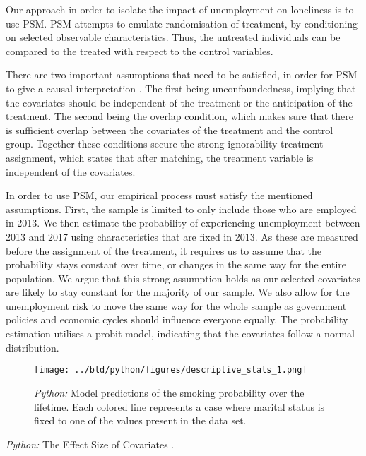 \documentclass[11pt, a4paper, leqno]{article}
\begin{document}
Our approach in order to isolate the impact of unemployment on loneliness is to use PSM. PSM attempts to emulate randomisation of treatment,
by conditioning on selected observable characteristics. Thus, the untreated individuals can be compared to the treated with respect to the control variables.

There are two important assumptions that need to be satisfied, in order for PSM to give a causal interpretation \cite{caliendo2008some}. The first being unconfoundedness, implying that the covariates should
be independent of the treatment or the anticipation of the treatment. The second being the overlap condition, which makes sure that there is sufficient overlap between the covariates of the treatment and the control group. Together these conditions secure the strong ignorability treatment assignment, which states that after matching, the treatment variable is independent of the covariates.

In order to use PSM, our empirical process must satisfy the mentioned assumptions. First, the sample is limited to only include those who are employed in 2013. We then estimate the probability of experiencing unemployment between 2013 and 2017 using characteristics that are fixed in 2013. As these are measured before the assignment of the treatment, it requires us
to assume that the probability stays constant over time, or changes in the same way for the entire population. We argue that this strong assumption holds as our selected covariates are likely to stay constant for the majority of our sample. We also allow for the unemployment risk to move the same way for the whole sample as government policies and economic cycles should influence everyone equally. The probability estimation utilises a probit model,
indicating that the covariates follow a normal distribution.

\begin{figure}[H]

    \centering
    \texttt{[image: ../bld/python/figures/descriptive\_stats\_1.png]}

    \caption{\emph{Python:} Model predictions of the smoking probability over the
        lifetime. Each colored line represents a case where marital status is fixed to one
        of the values present in the data set.}
    \label{fig:python-predictions}

\end{figure}


\begin{table}[!h]
    
    \caption{\label{tab:python-summary}\emph{Python:} The Effect Size of
    Covariates .}
\end{table}







\printbibliography
{}



\end{document}
